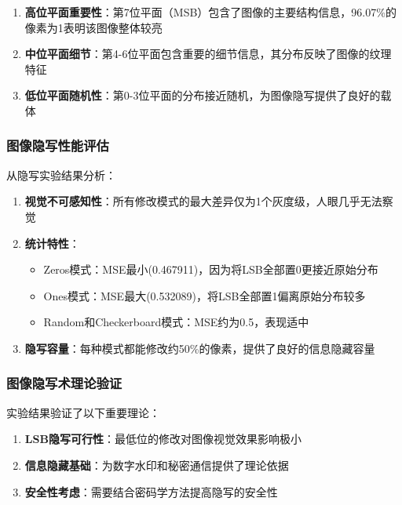 \documentclass[a4paper]{article}
\begin{document}
\begin{enumerate}
    \item \textbf{高位平面重要性}：第7位平面（MSB）包含了图像的主要结构信息，96.07\%的像素为1表明该图像整体较亮
    
    \item \textbf{中位平面细节}：第4-6位平面包含重要的细节信息，其分布反映了图像的纹理特征
    
    \item \textbf{低位平面随机性}：第0-3位平面的分布接近随机，为图像隐写提供了良好的载体
\end{enumerate}

\subsubsection{图像隐写性能评估}

从隐写实验结果分析：

\begin{enumerate}
    \item \textbf{视觉不可感知性}：所有修改模式的最大差异仅为1个灰度级，人眼几乎无法察觉
    
    \item \textbf{统计特性}：
    \begin{itemize}
        \item Zeros模式：MSE最小(0.467911)，因为将LSB全部置0更接近原始分布
        \item Ones模式：MSE最大(0.532089)，将LSB全部置1偏离原始分布较多
        \item Random和Checkerboard模式：MSE约为0.5，表现适中
    \end{itemize}
    
    \item \textbf{隐写容量}：每种模式都能修改约50\%的像素，提供了良好的信息隐藏容量
\end{enumerate}

\subsubsection{图像隐写术理论验证}

实验结果验证了以下重要理论：

\begin{enumerate}
    \item \textbf{LSB隐写可行性}：最低位的修改对图像视觉效果影响极小
    \item \textbf{信息隐藏基础}：为数字水印和秘密通信提供了理论依据
    \item \textbf{安全性考虑}：需要结合密码学方法提高隐写的安全性
\end{enumerate}
\end{document}
